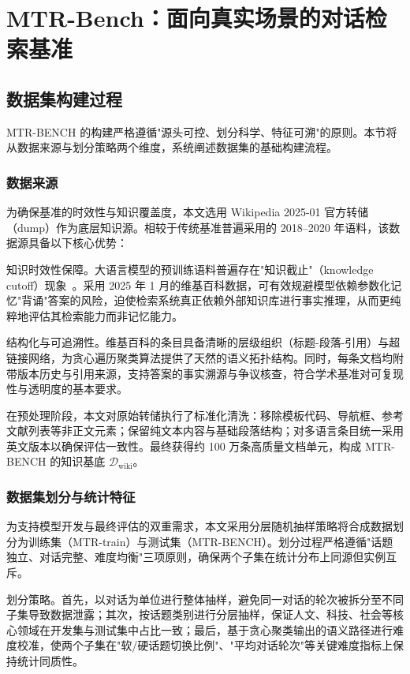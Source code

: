 \chapter{MTR-Bench：面向真实场景的对话检索基准}

\section{数据集构建过程}
\label{sec:dataset_construction}

MTR-BENCH 的构建严格遵循"源头可控、划分科学、特征可溯"的原则。本节将从数据来源与划分策略两个维度，系统阐述数据集的基础构建流程。

\subsection{数据来源}

为确保基准的时效性与知识覆盖度，本文选用 Wikipedia 2025-01 官方转储（dump）作为底层知识源。相较于传统基准普遍采用的 2018--2020 年语料，该数据源具备以下核心优势：

知识时效性保障。大语言模型的预训练语料普遍存在"知识截止"（knowledge cutoff）现象~\citep{kandpal2023largelanguagemodelsstruggle}。采用 2025 年 1 月的维基百科数据，可有效规避模型依赖参数化记忆"背诵"答案的风险，迫使检索系统真正依赖外部知识库进行事实推理，从而更纯粹地评估其检索能力而非记忆能力。

结构化与可追溯性。维基百科的条目具备清晰的层级组织（标题-段落-引用）与超链接网络，为贪心遍历聚类算法提供了天然的语义拓扑结构。同时，每条文档均附带版本历史与引用来源，支持答案的事实溯源与争议核查，符合学术基准对可复现性与透明度的基本要求。

在预处理阶段，本文对原始转储执行了标准化清洗：移除模板代码、导航框、参考文献列表等非正文元素；保留纯文本内容与基础段落结构；对多语言条目统一采用英文版本以确保评估一致性。最终获得约 100 万条高质量文档单元，构成 MTR-BENCH 的知识基底 $\mathcal{D}_{\text{wiki}}$。

\subsection{数据集划分与统计特征}

为支持模型开发与最终评估的双重需求，本文采用分层随机抽样策略将合成数据划分为训练集（MTR-train）与测试集（MTR-BENCH）。划分过程严格遵循"话题独立、对话完整、难度均衡"三项原则，确保两个子集在统计分布上同源但实例互斥。

划分策略。首先，以对话为单位进行整体抽样，避免同一对话的轮次被拆分至不同子集导致数据泄露；其次，按话题类别进行分层抽样，保证人文、科技、社会等核心领域在开发集与测试集中占比一致；最后，基于贪心聚类输出的语义路径进行难度校准，使两个子集在"软/硬话题切换比例"、"平均对话轮次"等关键难度指标上保持统计同质性。

